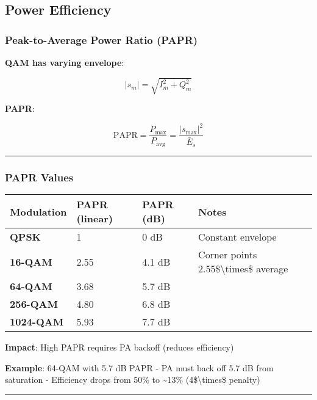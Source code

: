 \subsection{Power Efficiency}\label{power-efficiency}

\subsubsection{Peak-to-Average Power Ratio
(PAPR)}\label{peak-to-average-power-ratio-papr}

\textbf{QAM has varying envelope}:

\[
|s_m| = \sqrt{I_m^2 + Q_m^2}
\]

\textbf{PAPR}:

\[
\text{PAPR} = \frac{P_{\max}}{P_{\text{avg}}} = \frac{|s_{\max}|^2}{\bar{E}_s}
\]

\begin{center}\rule{0.5\linewidth}{0.5pt}\end{center}

\subsubsection{PAPR Values}\label{papr-values}

{\def\LTcaptype{} %
\begin{longtable}[]{@{}llll@{}}
\toprule\noalign{}
Modulation & PAPR (linear) & PAPR (dB) & Notes \\
\midrule\noalign{}
\endhead
\bottomrule\noalign{}
\endlastfoot
\textbf{QPSK} & 1 & 0 dB & Constant envelope \\
\textbf{16-QAM} & 2.55 & 4.1 dB & Corner points
2.55\$\textbackslash times\$ average \\
\textbf{64-QAM} & 3.68 & 5.7 dB & \\
\textbf{256-QAM} & 4.80 & 6.8 dB & \\
\textbf{1024-QAM} & 5.93 & 7.7 dB & \\
\end{longtable}
}

\textbf{Impact}: High PAPR requires PA backoff (reduces efficiency)

\textbf{Example}: 64-QAM with 5.7 dB PAPR - PA must back off 5.7 dB from
saturation - Efficiency drops from 50\% to \textasciitilde13\%
(4\$\textbackslash times\$ penalty)

\begin{center}\rule{0.5\linewidth}{0.5pt}\end{center}

